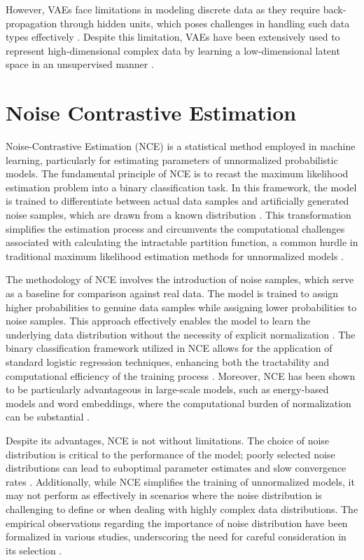However, VAEs face limitations in modeling discrete data as they require back-propagation through hidden units, which poses challenges 
in handling such data types effectively \citep{10.48550/arxiv.1909.13062}. Despite this limitation, VAEs have been extensively used to 
represent high-dimensional complex data by learning a low-dimensional latent space in an unsupervised manner \citep{10.48550/arxiv.2106.06500}.


\section{Noise Contrastive Estimation}


Noise-Contrastive Estimation (NCE) is a statistical method employed in machine learning, particularly for estimating parameters of unnormalized probabilistic models. The fundamental principle of NCE is to recast the maximum likelihood estimation problem into a binary classification task. In this framework, the model is trained to differentiate between actual data samples and artificially generated noise samples, which are drawn from a known distribution \citep{10.48550/arxiv.1711.00658}. This transformation simplifies the estimation process and circumvents the computational challenges associated with calculating the intractable partition function, a common hurdle in traditional maximum likelihood estimation methods for unnormalized models \citep{10.48550/arxiv.2110.11271}.

The methodology of NCE involves the introduction of noise samples, which serve as a baseline for comparison against real data. The model is trained to assign higher probabilities to genuine data samples while assigning lower probabilities to noise samples. This approach effectively enables the model to learn the underlying data distribution without the necessity of explicit normalization \citep{10.21437/interspeech.2016-1295}. The binary classification framework utilized in NCE allows for the application of standard logistic regression techniques, enhancing both the tractability and computational efficiency of the training process \citep{10.18653/v1/e17-2003}. Moreover, NCE has been shown to be particularly advantageous in large-scale models, such as energy-based models and word embeddings, where the computational burden of normalization can be substantial \citep{10.48550/arxiv.2101.03288}.

Despite its advantages, NCE is not without limitations. The choice of noise distribution is critical to the performance of the model; poorly selected noise distributions can lead to suboptimal parameter estimates and slow convergence rates \citep{10.48550/arxiv.2110.11271}. Additionally, while NCE simplifies the training of unnormalized models, it may not perform as effectively in scenarios where the noise distribution is challenging to define or when dealing with highly complex data distributions. The empirical observations regarding the importance of noise distribution have been formalized in various studies, underscoring the need for careful consideration in its selection \citep{10.48550/arxiv.2110.11271}.

